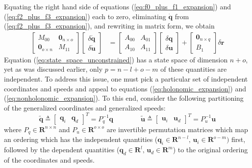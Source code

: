 \documentclass{svjour3}                     %
\begin{document}
Equating the right hand side of equations (\ref{eq:f0_plus_f1_expansion}) and
(\ref{eq:f2_plus_f3_expansion}) each to zero, eliminating $\bm{\dot{q}}$ from
(\ref{eq:f2_plus_f3_expansion}), and rewriting in matrix form, we obtain
\begin{align}
  \label{eq:state_space_unconstrained}
  \left[
    \begin{array}{cc}
      M_{00} & \bm{0}_{n \times o} \\
      \bm{0}_{o \times n} & M_{11}
    \end{array}
    \right]
    \left[
      \begin{array}{c}
        \delta \bm{\dot{q}} \\
        \delta \bm{\dot{u}}
      \end{array}
    \right]
   &=
   \left[
     \begin{array}{cc}
       A_{00} & A_{01} \\
       A_{10} & A_{11}
     \end{array}
   \right]
    \left[
      \begin{array}{c}
        \delta \bm{q} \\
        \delta \bm{u}
      \end{array}
    \right]
    +
    \left[
      \begin{array}{c}
        \bm{0}_{n \times q} \\
        B_{1}
      \end{array}
    \right]
    \delta \bm{r}
\end{align}
Equation (\ref{eq:state_space_unconstrained}) has a state space of dimension $n
+ o$, yet as was discussed earlier, only $p = n - l + o - m$ of these
quantities are independent.  To address this issue, one must pick a particular
set of independent coordinates and speeds and appeal to equations
(\ref{eq:holonomic_expansion}) and (\ref{eq:nonholonomic_expansion}).  To this
end, consider the following partitioning of the generalized coordinates and
generalized speeds:
\begin{equation*}
  \tilde{\bm{q}} \triangleq \left[\begin{array}{cc}\bm{q}_{i} &
      \bm{q}_{d}\end{array}\right]^{T} =  P_{q}^{-1} \bm{q}
      \qquad\qquad
  \tilde{\bm{u}} \triangleq \left[\begin{array}{cc}\bm{u}_{i} &
      \bm{u}_{d}\end{array}\right]^{T} =  P_{u}^{-1} \bm{u}
\end{equation*}
where $P_q \in \mathbf{R}^{n \times n}$ and $P_u \in \mathbf{R}^{o \times o}$
are invertible permutation matrices which map an ordering which has the
independent quantities ($\bm{q}_{i}\in\mathbf{R}^{n-l},\,
\bm{u}_{i}\in\mathbf{R}^{o-m})$ first, followed by the dependent quantities
($\bm{q}_{d}\in\mathbf{R}^{l},\, \bm{u}_{d}\in\mathbf{R}^{m}$) to the
original ordering of the coordinates and speeds.
\end{document}
